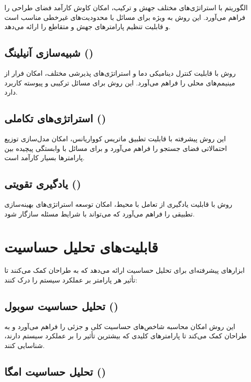 الگوریتم  با استراتژی‌های مختلف جهش و ترکیب، امکان کاوش کارآمد فضای طراحی را فراهم می‌آورد. این روش به ویژه برای مسائل با محدودیت‌های غیرخطی مناسب است و قابلیت تنظیم پارامترهای جهش و متقاطع را ارائه می‌دهد.

\subsection{شبیه‌سازی آنیلینگ ()}

روش  با قابلیت کنترل دینامیکی دما و استراتژی‌های پذیرشی مختلف، امکان فرار از مینیمم‌های محلی را فراهم می‌آورد. این روش برای مسائل ترکیبی و پیوسته کاربرد دارد.

\subsection{استراتژی‌های تکاملی ()}

این روش پیشرفته با قابلیت تطبیق ماتریس کوواریانس، امکان مدل‌سازی توزیع احتمالاتی فضای جستجو را فراهم می‌آورد و برای مسائل با وابستگی پیچیده بین پارامترها بسیار کارآمد است.

\subsection{یادگیری تقویتی ()}

روش  با قابلیت یادگیری از تعامل با محیط، امکان توسعه استراتژی‌های بهینه‌سازی تطبیقی را فراهم می‌آورد که می‌تواند با شرایط مسئله سازگار شود.

\section{قابلیت‌های تحلیل حساسیت}

 ابزارهای پیشرفته‌ای برای تحلیل حساسیت ارائه می‌دهد که به طراحان کمک می‌کنند تا تأثیر هر پارامتر بر عملکرد سیستم را درک کنند:

\subsection{تحلیل حساسیت سوبول ()}

این روش امکان محاسبه شاخص‌های حساسیت کلی و جزئی را فراهم می‌آورد و به طراحان کمک می‌کند تا پارامترهای کلیدی که بیشترین تأثیر را بر عملکرد سیستم دارند، شناسایی کنند.

\subsection{تحلیل حساسیت امگا ()}

